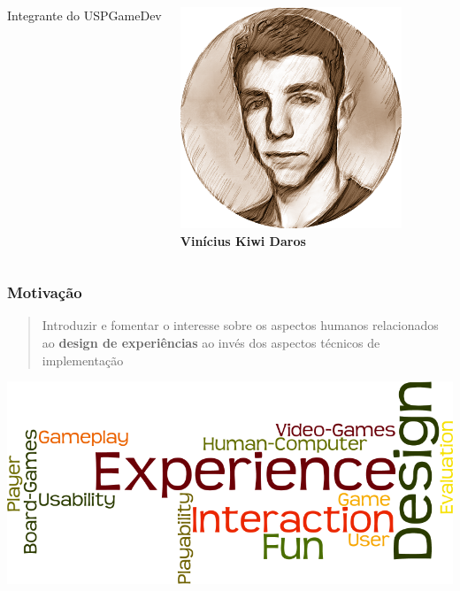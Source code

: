 \expandafter\documentclass\expandafter[table, usenames, svgnames, dvipsnames, \classopts]{beamer}
\begin{document}
\begin{frame}
\begin{columns}[c]
\begin{outline}
				\1 Integrante do USPGameDev
			\end{outline}
		
		
			\begin{center}
				\includegraphics[height=0.2\paperheight]{vinicius}\\
				\textbf{Vinícius Kiwi Daros}
			\end{center}
		
	\end{columns}	

\end{frame}

\begin{frame}
	\frametitle{\textbf{Motivação}}
	
	\begin{block}{}
	
		\vspace{1em}
	
		\begin{quotation}
			\noindent
			\justify
			{\large Introduzir e fomentar o interesse sobre os aspectos humanos relacionados ao \textbf{design de experiências} ao invés dos aspectos técnicos de implementação}
		\end{quotation}

		\vspace{1em}

	\end{block}
	
	\begin{center}
		\includegraphics[height=0.4\paperheight]{word-cloud}\\
	\end{center}

\end{frame}
\end{document}
